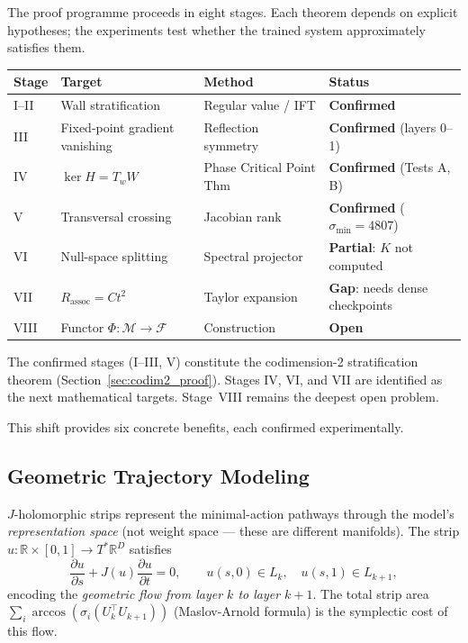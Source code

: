\documentclass[11pt]{amsart}
\begin{document}
The proof programme proceeds in eight stages.
Each theorem depends on explicit hypotheses; the experiments test
whether the trained system approximately satisfies them.

\begin{center}
\small
\begin{tabular}{@{}llll@{}}
\toprule
Stage & Target & Method & Status \\
\midrule
I--II & Wall stratification & Regular value / IFT & \textbf{Confirmed} \\
III   & Fixed-point gradient vanishing & Reflection symmetry & \textbf{Confirmed} (layers 0--1) \\
IV    & $\ker H = T_w W$ & Phase Critical Point Thm & \textbf{Confirmed} (Tests A, B) \\
V     & Transversal crossing & Jacobian rank & \textbf{Confirmed} ($\sigma_\mathrm{min}=4807$) \\
VI    & Null-space splitting & Spectral projector & \textbf{Partial}: $K$ not computed \\
VII   & $R_\mathrm{assoc} = Ct^2$ & Taylor expansion & \textbf{Gap}: needs dense checkpoints \\
VIII  & Functor $\Phi: \mathcal{M}\to\mathcal{F}$ & Construction & \textbf{Open} \\
\bottomrule
\end{tabular}
\end{center}

The confirmed stages (I--III, V) constitute the codimension-2 stratification
theorem (Section~\ref{sec:codim2_proof}).
Stages IV, VI, and VII are identified as the next mathematical targets.
Stage~VIII remains the deepest open problem.

This shift provides six concrete benefits, each confirmed experimentally.

\subsection{Geometric Trajectory Modeling}

$J$-holomorphic strips represent the minimal-action pathways through
the model's \emph{representation space}
(not weight space — these are different manifolds).
The strip $u: \mathbb{R}\times[0,1] \to T^*\mathbb{R}^D$ satisfies
\[
  \frac{\partial u}{\partial s} + J(u)\frac{\partial u}{\partial t} = 0,
  \qquad u(s,0)\in L_k,\quad u(s,1)\in L_{k+1},
\]
encoding the \emph{geometric flow from layer $k$ to layer $k+1$}.
The total strip area $\sum_i \arccos(\sigma_i(U_k^\top U_{k+1}))$
(Maslov-Arnold formula) is the symplectic cost of this flow.
\end{document}
